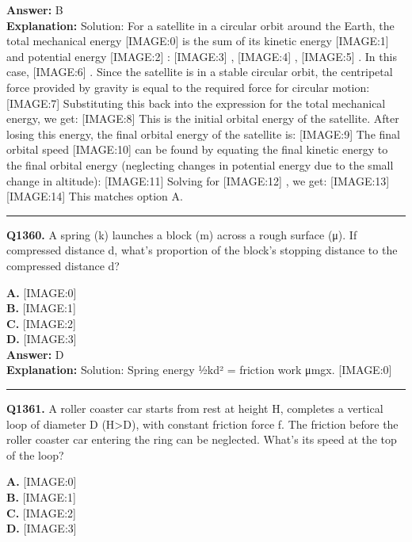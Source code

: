 \documentclass[12pt]{article}
\begin{document}
\textbf{Answer:} B \\
\textbf{Explanation:} Solution:
For a satellite in a circular orbit around the Earth, the total mechanical energy
[IMAGE:0]
is the sum of its kinetic energy
[IMAGE:1]
and potential energy
[IMAGE:2]
:
[IMAGE:3]
,
[IMAGE:4]
,
[IMAGE:5]
. In this case,
[IMAGE:6]
.
Since the satellite is in a stable circular orbit, the centripetal force provided by gravity is equal to the required force for circular motion:
[IMAGE:7]
Substituting this back into the expression for the total mechanical energy, we get:
[IMAGE:8]
This is the initial orbital energy of the satellite.
After losing this energy, the final orbital energy of the satellite is:
[IMAGE:9]
The final orbital speed
[IMAGE:10]
can be found by equating the final kinetic energy to the final orbital energy (neglecting changes in potential energy due to the small change in altitude):
[IMAGE:11]
Solving for
[IMAGE:12]
, we get:
[IMAGE:13]
[IMAGE:14]
This matches option A.

\hrule
\vspace{1em}


\noindent
\textbf{Q1360.} A spring (k) launches a block (m) across a rough surface (μ). If compressed distance d, what's proportion of the block's stopping distance to the compressed distance d?



\textbf{A.} [IMAGE:0] \\
\textbf{B.} [IMAGE:1] \\
\textbf{C.} [IMAGE:2] \\
\textbf{D.} [IMAGE:3] \\

\textbf{Answer:} D \\
\textbf{Explanation:} Solution: Spring energy ½kd² = friction work μmgx.
[IMAGE:0]

\hrule
\vspace{1em}


\noindent
\textbf{Q1361.} A roller coaster car starts from rest at height H, completes a vertical loop of diameter D (H>D), with constant friction force f. The friction before the roller coaster car entering the ring can be neglected. What's its speed at the top of the loop?



\textbf{A.} [IMAGE:0] \\
\textbf{B.} [IMAGE:1] \\
\textbf{C.} [IMAGE:2] \\
\textbf{D.} [IMAGE:3] \\
\end{document}
